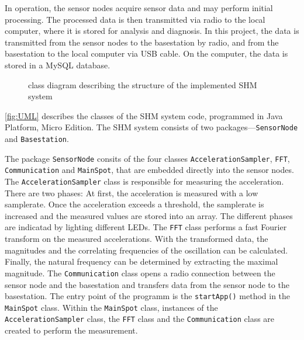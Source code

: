 \documentclass[12pt,a4paper]{scrartcl}
\begin{document}
In operation, the sensor nodes acquire sensor data and may perform initial processing.
The processed data is then transmitted via radio to the local computer, where it is stored for analysis and diagnosis.
In this project, the data is transmitted from the sensor nodes to the basestation by radio, and from the basestation to the local computer via USB cable.
On the computer, the data is stored in a MySQL database.

\begin{figure}[ht]
    \centering
    \caption{class diagram describing the structure of the implemented SHM system}
    \label{fig:UML}
\end{figure}

\autoref{fig:UML} describes the classes of the SHM system code, programmed in Java Platform, Micro Edition. 
The SHM system consists of two packages---\texttt{SensorNode} and \texttt{Basestation}.

The package \texttt{SensorNode} consits of the four classes \texttt{Acceleration\-Sampler}, \texttt{FFT}, \texttt{Communication} and \texttt{MainSpot}, that are embedded directly into the sensor nodes.
The \texttt{AccelerationSampler} class is responsible for measuring the acceleration.
There are two phases: At first, the acceleration is measured with a low samplerate.
Once the acceleration exceeds a threshold, the samplerate is increased and the measured values are stored into an array.
The different phases are indicatad by lighting different LEDs.
The \texttt{FFT} class performs a fast Fourier transform on the measured accelerations. 
With the transformed data, the magnitudes and the correlating frequencies of the oscillation can be calculated.
Finally, the natural frequency can be determined by extracting the maximal magnitude.
The \texttt{Communication} class opens a radio connection between the sensor node and the basestation and transfers data from the sensor node to the basestation.
The entry point of the programm is the \texttt{startApp()} method in the \texttt{MainSpot} class. 
Within the \texttt{MainSpot} class, instances of the \texttt{Acceleration\-Sampler} class, the \texttt{FFT} class and the \texttt{Communication} class are created to perform the measurement.
\end{document}
